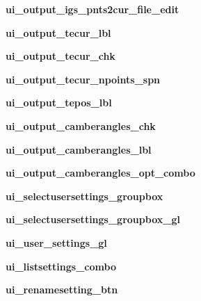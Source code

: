\begin{DoxyCompactItemize}
{\bfseries ui\+\_\+output\+\_\+igs\+\_\+pnts2cur\+\_\+file\+\_\+edit}
\item 
\hypertarget{a00077_af6b3a50b9ed8b101a02f8cd2103add7a}{}\label{a00077_af6b3a50b9ed8b101a02f8cd2103add7a} 
{\bfseries ui\+\_\+output\+\_\+tecur\+\_\+lbl}
\item 
\hypertarget{a00077_a8a199146fc853fdada7f050f108a22a2}{}\label{a00077_a8a199146fc853fdada7f050f108a22a2} 
{\bfseries ui\+\_\+output\+\_\+tecur\+\_\+chk}
\item 
\hypertarget{a00077_aec9a2b9c0199fa892631d906b1296a13}{}\label{a00077_aec9a2b9c0199fa892631d906b1296a13} 
{\bfseries ui\+\_\+output\+\_\+tecur\+\_\+npoints\+\_\+spn}
\item 
\hypertarget{a00077_a0906e6ac9dd29621615af0e54f1b2768}{}\label{a00077_a0906e6ac9dd29621615af0e54f1b2768} 
{\bfseries ui\+\_\+output\+\_\+tepos\+\_\+lbl}
\item 
\hypertarget{a00077_a6250f7ec5670033a6994818abf3d9b15}{}\label{a00077_a6250f7ec5670033a6994818abf3d9b15} 
{\bfseries ui\+\_\+output\+\_\+camberangles\+\_\+chk}
\item 
\hypertarget{a00077_ae0b09533ea5d38dcba89c010fcdc7886}{}\label{a00077_ae0b09533ea5d38dcba89c010fcdc7886} 
{\bfseries ui\+\_\+output\+\_\+camberangles\+\_\+lbl}
\item 
\hypertarget{a00077_a8c262e36d39977da647517cb97b7ab86}{}\label{a00077_a8c262e36d39977da647517cb97b7ab86} 
{\bfseries ui\+\_\+output\+\_\+camberangles\+\_\+opt\+\_\+combo}
\item 
\hypertarget{a00077_a868061df5f5e844caea1728de203129e}{}\label{a00077_a868061df5f5e844caea1728de203129e} 
{\bfseries ui\+\_\+selectusersettings\+\_\+groupbox}
\item 
\hypertarget{a00077_a5a42530f0dd7f8e7c2da3074565220be}{}\label{a00077_a5a42530f0dd7f8e7c2da3074565220be} 
{\bfseries ui\+\_\+selectusersettings\+\_\+groupbox\+\_\+gl}
\item 
\hypertarget{a00077_aa064aa43c06b096e6d2753909fddf376}{}\label{a00077_aa064aa43c06b096e6d2753909fddf376} 
{\bfseries ui\+\_\+user\+\_\+settings\+\_\+gl}
\item 
\hypertarget{a00077_a1ac2324eaa26fdc7d7a038b7df328a0d}{}\label{a00077_a1ac2324eaa26fdc7d7a038b7df328a0d} 
{\bfseries ui\+\_\+listsettings\+\_\+combo}
\item 
\hypertarget{a00077_a720608a6cc8575e078cd4e807dfe1031}{}\label{a00077_a720608a6cc8575e078cd4e807dfe1031} 
{\bfseries ui\+\_\+renamesetting\+\_\+btn}
\item 
\hypertarget{a00077_af95ad0699234293c4dbeaa2fbf3af607}{}\label{a00077_af95ad0699234293c4dbeaa2fbf3af607} 

\end{DoxyCompactItemize}
